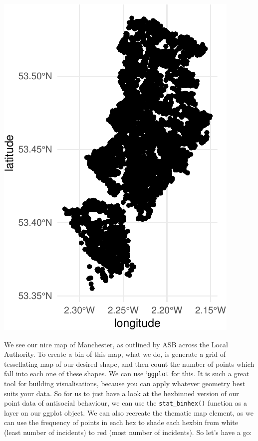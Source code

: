 \documentclass[
]{book}
\begin{document}
\includegraphics{crime_mapping_files/figure-latex/unnamed-chunk-124-1.pdf}

We see our nice map of Manchester, as outlined by ASB across the Local Authority. To create a bin of this map, what we do, is generate a grid of tessellating map of our desired shape, and then count the number of points which fall into each one of these shapes. We can use `\texttt{ggplot} for this. It is such a great tool for building visualisations, because you can apply whatever geometry best suits your data. So for us to just have a look at the hexbinned version of our point data of antisocial behaviour, we can use the \texttt{stat\_binhex()} function as a layer on our ggplot object. We can also recreate the thematic map element, as we can use the frequency of points in each hex to shade each hexbin from white (least number of incidents) to red (most number of incidents). So let's have a go:
\end{document}
